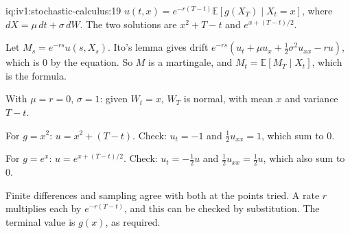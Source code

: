 \begin{solution}{iq:iv1:stochastic-calculus:19}
$u(t, x) = e^{-r(T - t)}\mathbb{E}[g(X_T) \mid X_t = x]$, where $dX = \mu\,dt + \sigma\,dW$. The two solutions are $x^2 + T - t$ and $e^{x + (T - t)/2}$.

Let $M_s = e^{-rs}u(s, X_s)$. Ito's lemma gives drift $e^{-rs}(u_t + \mu u_x + \frac12\sigma^2u_{xx} - ru)$, which is 0 by the equation. So $M$ is a martingale, and $M_t = \mathbb{E}[M_T \mid X_t]$, which is the formula.

With $\mu = r = 0$, $\sigma = 1$: given $W_t = x$, $W_T$ is normal, with mean $x$ and variance $T - t$.

For $g = x^2$: $u = x^2 + (T - t)$. Check: $u_t = -1$ and $\frac12u_{xx} = 1$, which sum to 0.

For $g = e^x$: $u = e^{x + (T - t)/2}$. Check: $u_t = -\frac12u$ and $\frac12u_{xx} = \frac12u$, which also sum to 0.

Finite differences and sampling agree with both at the points tried. A rate $r$ multiplies each by $e^{-r(T - t)}$, and this can be checked by substitution. The terminal value is $g(x)$, as required.



\end{solution}

